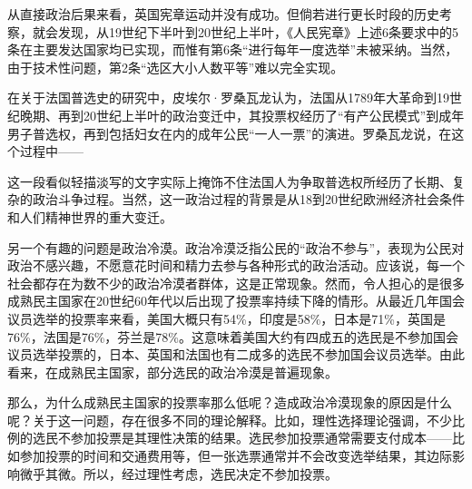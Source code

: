 从直接政治后果来看，英国宪章运动并没有成功。但倘若进行更长时段的历史考察，就会发现，从19世纪下半叶到20世纪上半叶，《人民宪章》上述6条要求中的5条在主要发达国家均已实现，而惟有第6条“进行每年一度选举”未被采纳。当然，由于技术性问题，第2条“选区大小人数平等”难以完全实现。

在关于法国普选史的研究中，皮埃尔·罗桑瓦龙认为，法国从1789年大革命到19世纪晚期、再到20世纪上半叶的政治变迁中，其投票权经历了“有产公民模式”到成年男子普选权，再到包括妇女在内的成年公民“一人一票”的演进。罗桑瓦龙说，在这个过程中——


这一段看似轻描淡写的文字实际上掩饰不住法国人为争取普选权所经历了长期、复杂的政治斗争过程。当然，这一政治过程的背景是从18到20世纪欧洲经济社会条件和人们精神世界的重大变迁。


另一个有趣的问题是政治冷漠。政治冷漠泛指公民的“政治不参与”，表现为公民对政治不感兴趣，不愿意花时间和精力去参与各种形式的政治活动。应该说，每一个社会都存在为数不少的政治冷漠者群体，这是正常现象。然而，令人担心的是很多成熟民主国家在20世纪60年代以后出现了投票率持续下降的情形。从最近几年国会议员选举的投票率来看，美国大概只有54\%，印度是58\%，日本是71\%，英国是76\%，法国是76\%，芬兰是78\%。这意味着美国大约有四成五的选民是不参加国会议员选举投票的，日本、英国和法国也有二成多的选民不参加国会议员选举。由此看来，在成熟民主国家，部分选民的政治冷漠是普遍现象。

那么，为什么成熟民主国家的投票率那么低呢？造成政治冷漠现象的原因是什么呢？关于这一问题，存在很多不同的理论解释。比如，理性选择理论强调，不少比例的选民不参加投票是其理性决策的结果。选民参加投票通常需要支付成本——比如参加投票的时间和交通费用等，但一张选票通常并不会改变选举结果，其边际影响微乎其微。所以，经过理性考虑，选民决定不参加投票。

